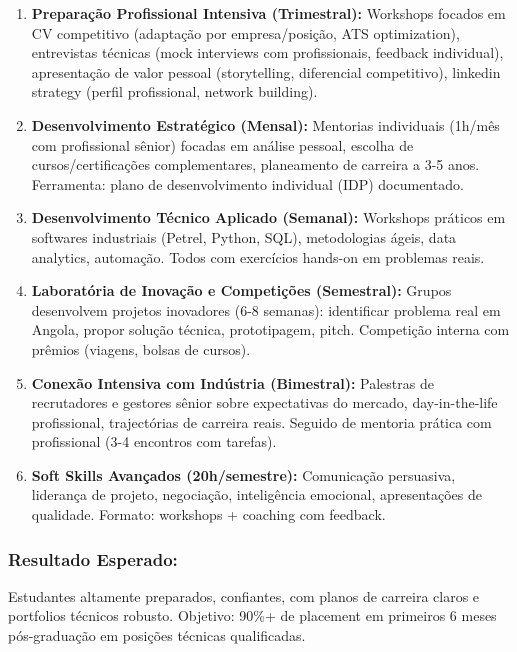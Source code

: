 \documentclass[12pt,a4paper]{article}
\begin{document}
\begin{enumerate}[itemsep=0.25cm]
    \item \textbf{Preparação Profissional Intensiva (Trimestral):} Workshops focados em CV competitivo (adaptação por empresa/posição, ATS optimization), entrevistas técnicas (mock interviews com profissionais, feedback individual), apresentação de valor pessoal (storytelling, diferencial competitivo), linkedin strategy (perfil profissional, network building).
    
    \item \textbf{Desenvolvimento Estratégico (Mensal):} Mentorias individuais (1h/mês com profissional sênior) focadas em análise pessoal, escolha de cursos/certificações complementares, planeamento de carreira a 3-5 anos. Ferramenta: plano de desenvolvimento individual (IDP) documentado.
    
    \item \textbf{Desenvolvimento Técnico Aplicado (Semanal):} Workshops práticos em softwares industriais (Petrel, Python, SQL), metodologias ágeis, data analytics, automação. Todos com exercícios hands-on em problemas reais.
    
    \item \textbf{Laboratória de Inovação e Competições (Semestral):} Grupos desenvolvem projetos inovadores (6-8 semanas): identificar problema real em Angola, propor solução técnica, prototipagem, pitch. Competição interna com prêmios (viagens, bolsas de cursos).
    
    \item \textbf{Conexão Intensiva com Indústria (Bimestral):} Palestras de recrutadores e gestores sênior sobre expectativas do mercado, day-in-the-life profissional, trajectórias de carreira reais. Seguido de mentoria prática com profissional (3-4 encontros com tarefas).
    
    \item \textbf{Soft Skills Avançados (20h/semestre):} Comunicação persuasiva, liderança de projeto, negociação, inteligência emocional, apresentações de qualidade. Formato: workshops + coaching com feedback.
\end{enumerate}

\subsubsection*{Resultado Esperado:}
Estudantes altamente preparados, confiantes, com planos de carreira claros e portfolios técnicos robusto. Objetivo: 90\%+ de placement em primeiros 6 meses pós-graduação em posições técnicas qualificadas.
\end{document}
